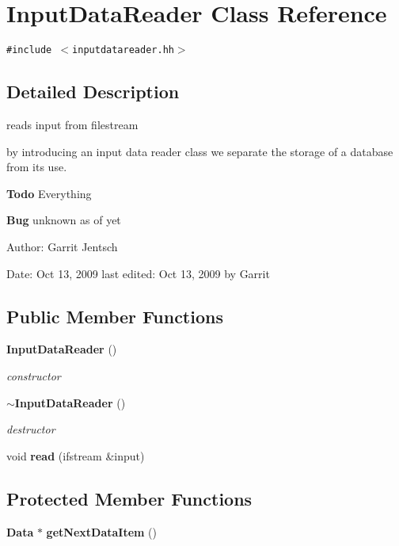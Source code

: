 \section{InputDataReader Class Reference}
\label{classInputDataReader}
{\tt \#include $<$inputdatareader.hh$>$}



\subsection{Detailed Description}
reads input from filestream 

by introducing an input data reader class we separate the storage of a database from its use.

\begin{Desc}
\item[{\bf Todo}]Everything\end{Desc}
\begin{Desc}
\item[{\bf Bug}]unknown as of yet\end{Desc}
\begin{Desc}
\item[Author:]Garrit Jentsch\end{Desc}
\begin{Desc}
\item[Date:]Oct 13, 2009 last edited: Oct 13, 2009 by Garrit \end{Desc}
\subsection*{Public Member Functions}
\begin{CompactItemize}
\item 
{\bf InputDataReader} ()
\begin{CompactList}\small\item\em constructor \item\end{CompactList}\item 
{\bf $\sim$InputDataReader} ()
\begin{CompactList}\small\item\em destructor \item\end{CompactList}\item 
void {\bf read} (ifstream \&input)
\end{CompactItemize}
\subsection*{Protected Member Functions}
\begin{CompactItemize}
\item 
{\bf Data} $\ast$ {\bf getNextDataItem} ()
\end{CompactItemize}


